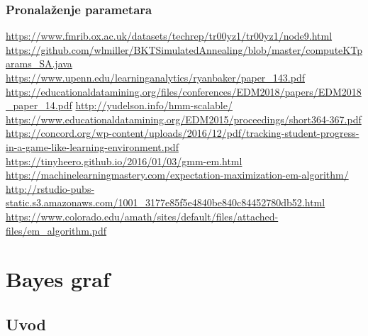\documentclass[times, utf8,projekt]{fer}
\begin{document}
\subsection{Pronalaženje parametara}
\url{https://www.fmrib.ox.ac.uk/datasets/techrep/tr00yz1/tr00yz1/node9.html}\newline
\url{https://github.com/wlmiller/BKTSimulatedAnnealing/blob/master/computeKTparams_SA.java}\newline
\url{https://www.upenn.edu/learninganalytics/ryanbaker/paper_143.pdf}\newline
\url{https://educationaldatamining.org/files/conferences/EDM2018/papers/EDM2018_paper_14.pdf}\newline
\url{http://yudelson.info/hmm-scalable/}\newline
\url{https://www.educationaldatamining.org/EDM2015/proceedings/short364-367.pdf}\newline
\url{https://concord.org/wp-content/uploads/2016/12/pdf/tracking-student-progress-in-a-game-like-learning-environment.pdf}\newline
\url{https://tinyheero.github.io/2016/01/03/gmm-em.html}\newline
\url{https://machinelearningmastery.com/expectation-maximization-em-algorithm/}\newline
\url{http://rstudio-pubs-static.s3.amazonaws.com/1001_3177e85f5e4840be840c84452780db52.html}\newline
\url{https://www.colorado.edu/amath/sites/default/files/attached-files/em_algorithm.pdf}
\chapter{Bayes graf}
	\section{Uvod}
	
\end{document}

